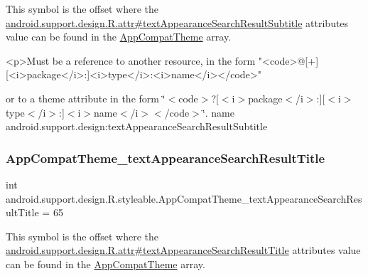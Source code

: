 This symbol is the offset where the \hyperlink{classandroid_1_1support_1_1design_1_1R_1_1attr_ad4c3cf0a421f6da8cf158eb72380097d}{android.\+support.\+design.\+R.\+attr\#text\+Appearance\+Search\+Result\+Subtitle} attribute\textquotesingle{}s value can be found in the \hyperlink{classandroid_1_1support_1_1design_1_1R_1_1styleable_afb351dc8de20cbd4c89abe360373010c}{App\+Compat\+Theme} array.

\begin{DoxyVerb}      <p>Must be a reference to another resource, in the form "<code>@[+][<i>package</i>:]<i>type</i>:<i>name</i></code>"
\end{DoxyVerb}
 or to a theme attribute in the form \char`\"{}$<$code$>$?\mbox{[}$<$i$>$package$<$/i$>$\+:\mbox{]}\mbox{[}$<$i$>$type$<$/i$>$\+:\mbox{]}$<$i$>$name$<$/i$>$$<$/code$>$\char`\"{}.  name android.\+support.\+design\+:text\+Appearance\+Search\+Result\+Subtitle \mbox{\label{classandroid_1_1support_1_1design_1_1R_1_1styleable_aa3f93225ffeded406d20658eb3447964}} 
\subsubsection{\texorpdfstring{App\+Compat\+Theme\+\_\+text\+Appearance\+Search\+Result\+Title}{AppCompatTheme\_textAppearanceSearchResultTitle}}
{\footnotesize\ttfamily int android.\+support.\+design.\+R.\+styleable.\+App\+Compat\+Theme\+\_\+text\+Appearance\+Search\+Result\+Title = 65\hspace{0.3cm}{\ttfamily [static]}}

This symbol is the offset where the \hyperlink{classandroid_1_1support_1_1design_1_1R_1_1attr_a15f9a24fe28950f36a19a12cef2cae15}{android.\+support.\+design.\+R.\+attr\#text\+Appearance\+Search\+Result\+Title} attribute\textquotesingle{}s value can be found in the \hyperlink{classandroid_1_1support_1_1design_1_1R_1_1styleable_afb351dc8de20cbd4c89abe360373010c}{App\+Compat\+Theme} array.

